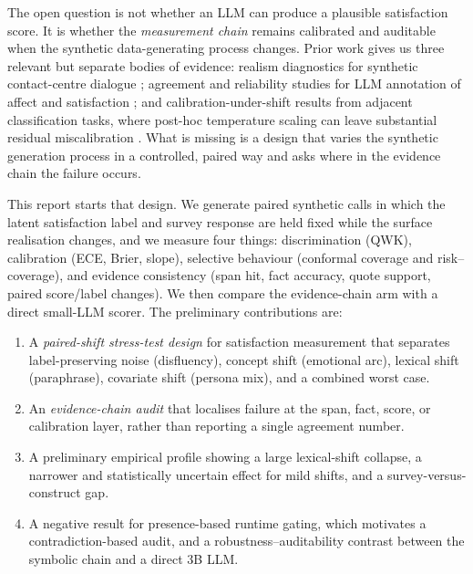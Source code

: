 \documentclass[11pt,a4paper]{article}
\begin{document}
The open question is not whether an LLM can produce a plausible satisfaction score. It is
whether the \emph{measurement chain} remains calibrated and auditable when the synthetic
data-generating process changes. Prior work gives us three relevant but separate bodies of
evidence: realism diagnostics for synthetic contact-centre dialogue
\citep{devanathan2026mirage,soudani2026survey,zhu2026customer}; agreement and reliability studies
for LLM annotation of affect and satisfaction
\citep{kumar2026empathic,krawczyk2026satisfaction}; and calibration-under-shift results from
adjacent classification tasks, where post-hoc temperature scaling can leave substantial residual
miscalibration \citep{guo2017calibration,wang2026care}. What is missing is a design that varies
the synthetic generation process in a controlled, paired way and asks where in the evidence
chain the failure occurs.

This report starts that design. We generate paired synthetic calls in which the latent
satisfaction label and survey response are held fixed while the surface realisation changes, and
we measure four things: discrimination (QWK), calibration (ECE, Brier, slope), selective
behaviour (conformal coverage and risk--coverage), and evidence consistency (span hit, fact
accuracy, quote support, paired score/label changes). We then compare the evidence-chain arm
with a direct small-LLM scorer. The preliminary contributions are:

\begin{enumerate}[leftmargin=1.4em,itemsep=0.25em]
\item A \emph{paired-shift stress-test design} for satisfaction measurement that separates
label-preserving noise (disfluency), concept shift (emotional arc), lexical shift (paraphrase),
covariate shift (persona mix), and a combined worst case.
\item An \emph{evidence-chain audit} that localises failure at the span, fact, score, or
calibration layer, rather than reporting a single agreement number.
\item A preliminary empirical profile showing a large lexical-shift collapse, a narrower and
statistically uncertain effect for mild shifts, and a survey-versus-construct gap.
\item A negative result for presence-based runtime gating, which motivates a contradiction-based
audit, and a robustness--auditability contrast between the symbolic chain and a direct 3B LLM.
\end{enumerate}
\end{document}
